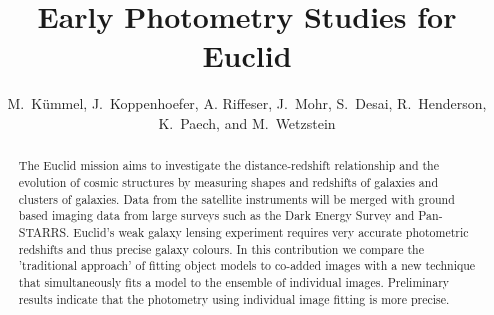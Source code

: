 
\resetcounters




\title{Early Photometry Studies for Euclid}
\author{M.\ K\"ummel, J.\ Koppenhoefer, A. Riffeser, J.\ Mohr,
S.\ Desai, R.\ Henderson, K.\ Paech, and M.\ Wetzstein
}


\begin{abstract}
The Euclid mission aims to investigate the distance-redshift relationship and the evolution of cosmic structures by measuring shapes and redshifts of galaxies and clusters of galaxies. Data from the satellite instruments will be merged with ground based imaging data from large surveys such as the Dark Energy Survey and Pan-STARRS. Euclid's weak galaxy lensing experiment requires very accurate photometric redshifts and thus precise galaxy colours. In this contribution we compare the 'traditional approach' of fitting object models to co-added images with a new technique that simultaneously fits a model to the ensemble of individual images. Preliminary results indicate that the photometry using individual image fitting is more precise.
\end{abstract}

